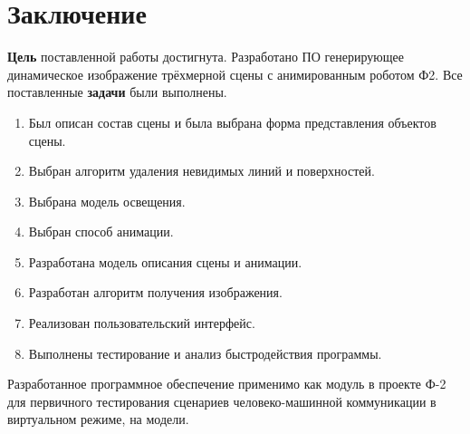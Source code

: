 
\chapter*{Заключение}

\textbf{Цель} поставленной работы достигнута. Разработано ПО генерирующее динамическое изображение трёхмерной сцены с анимированным роботом Ф2. Все поставленные \textbf{задачи} были выполнены.

\begin{enumerate}
	\item Был описан состав сцены и была выбрана форма представления объектов сцены.
	
	\item Выбран алгоритм удаления невидимых линий и поверхностей.
	
	\item Выбрана модель освещения.
	
	\item Выбран способ анимации.
	
	\item Разработана модель описания сцены и анимации.
	
	\item Разработан алгоритм получения изображения.
	
	\item Реализован пользовательский интерфейс.
	
	\item Выполнены тестирование и анализ быстродействия программы.
	
\end{enumerate}

Разработанное программное обеспечение применимо как модуль в проекте Ф-2 для первичного тестирования сценариев человеко-машинной коммуникации в виртуальном режиме, на модели.
